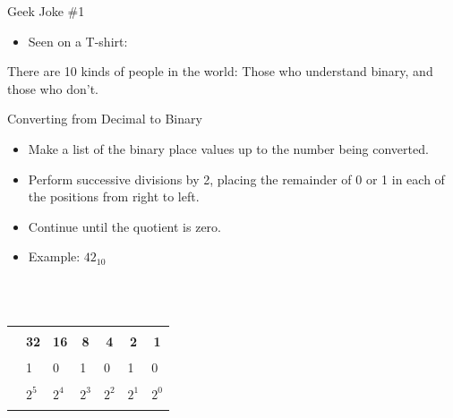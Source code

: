 \documentclass[graphics]{beamer}
\newcommand\redout{\bgroup\markoverwith
{\textcolor{red}{\rule[0.5ex]{2pt}{0.8pt}}}\ULon}
\newcommand*{\thead}[1]{\multicolumn{1}{c}{\bfseries #1}}
\begin{document}
\begin{frame}{Geek Joke \#1}
    \begin{itemize}
        \item Seen on a T-shirt:
    \end{itemize}
    There are 10 kinds of people in the world: Those who understand binary, and those who don't.
\end{frame}

\begin{frame}{Converting from Decimal to Binary}
    \begin{itemize}
        \item Make a list of the binary place values up to the number being converted.
        \item Perform successive divisions by 2, placing the remainder of 0 or 1 in each of the positions from right to left.
        \item Continue until the quotient is zero.
        \item Example: $42_{10}$
    \end{itemize}
    \\ ~~ \\
    \centering
    \begin{tabular}{c l l l l l l}
        \redout{\thead{64}} & \thead{32} & \thead{16} & \thead{8} & \thead{4} & \thead{2} & \thead{1} \\
        & 1 & 0 & 1 & 0 & 1 & 0 \\
        \redout{$2^6$} & $2^5$ & $2^4$ & $2^3$ & $2^2$ & $2^1$ & $2^0$
    \end{tabular}
\end{frame}
\end{document}

